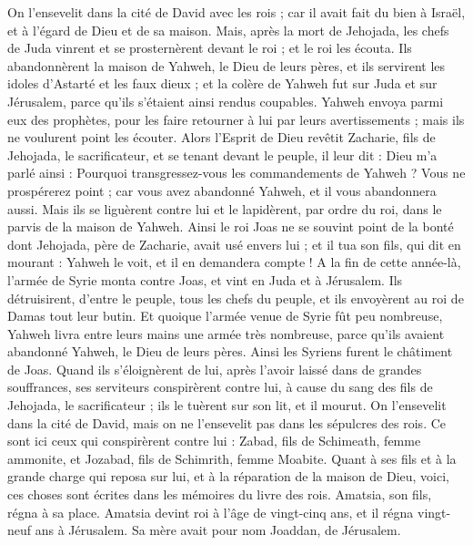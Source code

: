 \begin{multicols}{2}
On l'ensevelit dans la cité de David avec les rois ; car il avait fait du bien à Israël, et à l'égard de Dieu et de sa maison.
Mais, après la mort de Jehojada, les chefs de Juda vinrent et se prosternèrent devant le roi ; et le roi les écouta.
Ils abandonnèrent la maison de Yahweh, le Dieu de leurs pères, et ils servirent les idoles d'Astarté et les faux dieux ; et la colère de Yahweh fut sur Juda et sur Jérusalem, parce qu'ils s'étaient ainsi rendus coupables.
Yahweh envoya parmi eux des prophètes, pour les faire retourner à lui par leurs avertissements ; mais ils ne voulurent point les écouter.
Alors l'Esprit de Dieu revêtit Zacharie, fils de Jehojada, le sacrificateur, et se tenant devant le peuple, il leur dit : Dieu m’a parlé ainsi : Pourquoi transgressez-vous les commandements de Yahweh ? Vous ne prospérerez point ; car vous avez abandonné Yahweh, et il vous abandonnera aussi.
Mais ils se liguèrent contre lui et le lapidèrent, par ordre du roi, dans le parvis de la maison de Yahweh.
Ainsi le roi Joas ne se souvint point de la bonté dont Jehojada, père de Zacharie, avait usé envers lui ; et il tua son fils, qui dit en mourant : Yahweh le voit, et il en demandera compte !
A la fin de cette année-là, l'armée de Syrie monta contre Joas, et vint en Juda et à Jérusalem. Ils détruisirent, d'entre le peuple, tous les chefs du peuple, et ils envoyèrent au roi de Damas tout leur butin.
Et quoique l'armée venue de Syrie fût peu nombreuse, Yahweh livra entre leurs mains une armée très nombreuse, parce qu'ils avaient abandonné Yahweh, le Dieu de leurs pères. Ainsi les Syriens furent le châtiment de Joas.
Quand ils s’éloignèrent de lui, après l'avoir laissé dans de grandes souffrances, ses serviteurs conspirèrent contre lui, à cause du sang des fils de Jehojada, le sacrificateur ; ils le tuèrent sur son lit, et il mourut. On l'ensevelit dans la cité de David, mais on ne l'ensevelit pas dans les sépulcres des rois.
Ce sont ici ceux qui conspirèrent contre lui : Zabad, fils de Schimeath, femme ammonite, et Jozabad, fils de Schimrith, femme Moabite.
Quant à ses fils et à la grande charge qui  reposa sur lui, et à la réparation de la maison de Dieu, voici, ces choses sont écrites dans les mémoires du livre des rois. Amatsia, son fils, régna à sa place.
\VerseOne{}Amatsia devint roi à l'âge de vingt-cinq ans, et il régna vingt-neuf ans à Jérusalem. Sa mère avait pour nom Joaddan, de Jérusalem.

\end{multicols}
